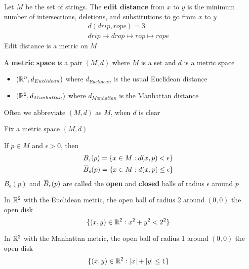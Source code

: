 \documentclass[11pt]{article}
\begin{document}
\begin{examplle}[]
Let \(M\) be the set of strings. The \textbf{edit distance} from \(x\) to \(y\) is the minimum number of
intersections, deletions, and substitutions to go from \(x\) to \(y\)
\begin{gather*}
  d(drip,rope)=3\\
  drip\mapsto drop\mapsto rop\mapsto rope
\end{gather*}
Edit distance is a metric on \(M\)
\end{examplle}

\begin{definition}[]
A \textbf{metric space} is a pair \((M,d)\) where \(M\) is a set and \(d\) is a metric space
\end{definition}

\begin{itemize}
\item \((\mathbb{R}^n,d_{Euclidean})\) where \(d_{Euclidean}\) is the usual Euclidean distance
\item \((\mathbb{R}^2,d_{Manhattan})\) where \(d_{Manhattan}\) is the Manhattan distance
\end{itemize}


Often we abbreviate \((M,d)\) as \(M\), when \(d\) is clear

Fix a metric space \((M,d)\)

\begin{definition}[]
If \(p\in M\) and \(\epsilon>0\), then
\begin{align*}
&B_\epsilon(p)=\{x\in M:d(x,p)<\epsilon\}\\
&\barB_\epsilon(p)=\{x\in M:d(x,p)\le\epsilon\}\\
\end{align*}
\(B_\epsilon(p)\) and \(\barB_\epsilon(p)\) are called the \textbf{open} and \textbf{closed} balls of radius \(\epsilon\) around \(p\)
\end{definition}

\begin{examplle}[]
In \(\mathbb{R}^2\) with the Euclidean metric, the open ball of radius 2 around \((0,0)\) the open disk
\begin{equation*}
\{(x,y)\in\mathbb{R}^2:x^2+y^2<2^2\}
\end{equation*}
\end{examplle}

\begin{examplle}[]
In \(\mathbb{R}^2\) with the Manhattan metric, the open ball of radius 1 around \((0,0)\) the open disk
\begin{equation*}
\{(x,y)\in\R^2:\abs{x}+\abs{y}\le 1\}
\end{equation*}
\end{examplle}
\end{document}
